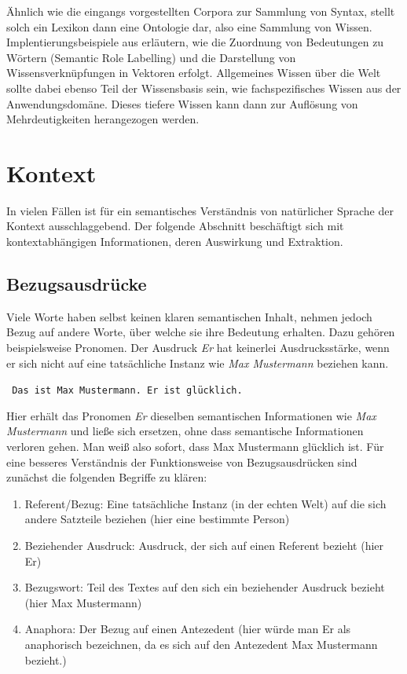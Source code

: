 \documentclass[12pt]{report}
\begin{document}
Ähnlich wie die eingangs vorgestellten Corpora zur Sammlung von Syntax, stellt solch ein Lexikon dann eine Ontologie dar, also eine Sammlung von Wissen. Implentierungsbeispiele aus \cite{col11} erläutern, wie die Zuordnung von Bedeutungen zu Wörtern (Semantic Role Labelling) und die Darstellung von Wissensverknüpfungen in Vektoren erfolgt. Allgemeines Wissen über die Welt sollte dabei ebenso Teil der Wissensbasis sein, wie fachspezifisches Wissen aus der Anwendungsdomäne. Dieses tiefere Wissen kann dann zur Auflösung von Mehrdeutigkeiten herangezogen werden.

\section{Kontext}
In vielen Fällen ist für ein semantisches Verständnis von natürlicher Sprache der Kontext ausschlaggebend. Der folgende Abschnitt beschäftigt sich mit kontextabhängigen Informationen, deren Auswirkung und Extraktion. 

\subsection{Bezugsausdrücke}
Viele Worte haben selbst keinen klaren semantischen Inhalt, nehmen jedoch Bezug auf andere Worte, über welche sie ihre Bedeutung erhalten. Dazu gehören beispielsweise Pronomen. Der Ausdruck \textit{\glqq  Er\grqq{}} hat keinerlei Ausdrucksstärke, wenn er sich nicht auf eine tatsächliche Instanz wie \textit{\glqq  Max Mustermann\grqq{}} beziehen kann.

\tt
Das ist Max Mustermann. Er ist glücklich.
\rm

Hier erhält das Pronomen \textit{\glqq  Er\grqq{}} dieselben semantischen Informationen wie \textit{Max Mustermann} und ließe sich ersetzen, ohne dass semantische Informationen verloren gehen. Man weiß also sofort, dass Max Mustermann glücklich ist. Für eine besseres Verständnis der Funktionsweise von Bezugsausdrücken sind zunächst die folgenden Begriffe zu klären:

\begin{enumerate}
\item Referent/Bezug: Eine tatsächliche Instanz (in der echten Welt) auf die sich andere Satzteile beziehen (hier eine bestimmte Person)
\item Beziehender Ausdruck: Ausdruck, der sich auf einen Referent bezieht (hier \glqq  Er\grqq{})
\item Bezugswort: Teil des Textes auf den sich ein beziehender Ausdruck bezieht (hier Max Mustermann)
\item Anaphora: Der Bezug auf einen Antezedent (hier würde man \glqq  Er\grqq{} als anaphorisch bezeichnen, da es sich auf den Antezedent Max Mustermann bezieht.) 
\end{enumerate}
\end{document}

